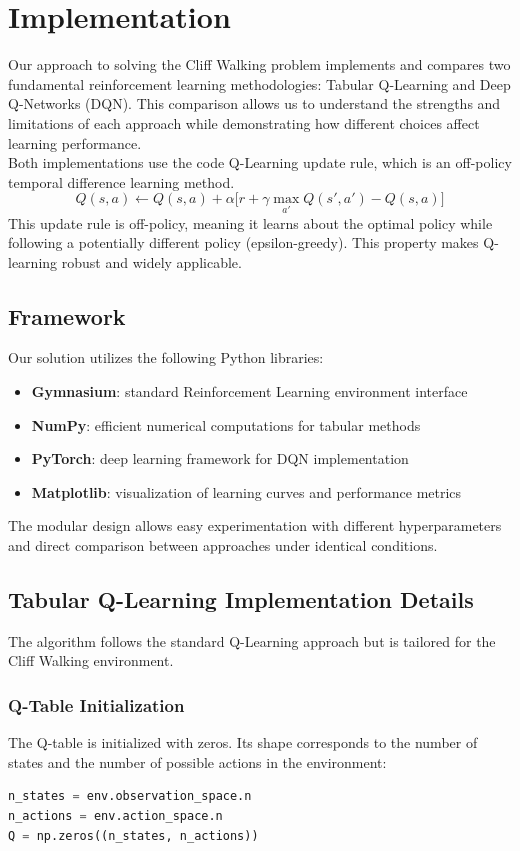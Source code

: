\documentclass[a4paper,12pt]{article}
\begin{document}
\section{Implementation}
Our approach to solving the Cliff Walking problem implements and compares two fundamental reinforcement learning methodologies: Tabular Q-Learning and Deep Q-Networks (DQN). This comparison allows us to understand the strengths and limitations of each approach while demonstrating how different choices affect learning performance.
\vspace{0,5cm}\\
Both implementations use the code Q-Learning update rule, which is an off-policy temporal difference learning method.
$$Q(s,a) \leftarrow Q(s,a) + \alpha \big[r + \gamma \max_{a'} Q(s',a') - Q(s,a)\big]$$
This update rule is off-policy, meaning it learns about the optimal policy while following a potentially different policy (epsilon-greedy). This property makes Q-learning robust and widely applicable.
\subsection{Framework}
Our solution utilizes the following Python libraries:
\begin{itemize}
    \item \textbf{Gymnasium}: standard Reinforcement Learning environment interface
    \item \textbf{NumPy}: efficient numerical computations for tabular methods
    \item \textbf{PyTorch}: deep learning framework for DQN implementation
    \item \textbf{Matplotlib}: visualization of learning curves and performance metrics
\end{itemize}
The modular design allows easy experimentation with different hyperparameters and direct comparison between approaches under identical conditions.
\subsection{Tabular Q-Learning Implementation Details}
The algorithm follows the standard Q-Learning approach but is tailored for the Cliff Walking environment.
\subsubsection{Q-Table Initialization}
The Q-table is initialized with zeros. Its shape corresponds to the number of states and the number of possible actions in the environment:
\begin{lstlisting}[language=Python]
n_states = env.observation_space.n
n_actions = env.action_space.n
Q = np.zeros((n_states, n_actions))
\end{lstlisting}
\end{document}
